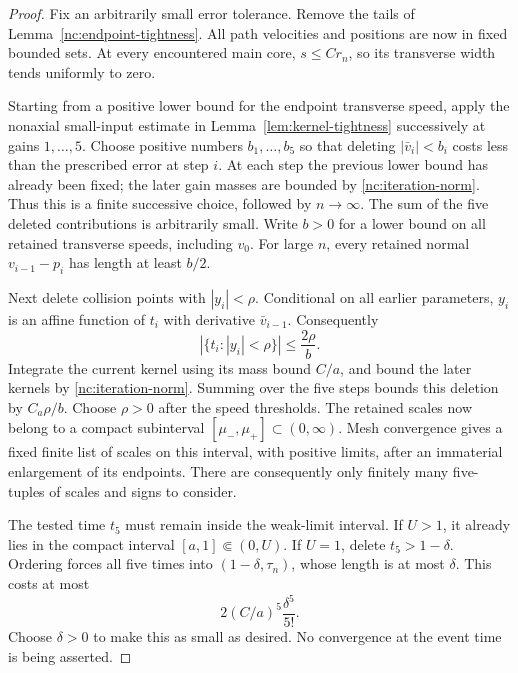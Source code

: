 \begin{proof}
Fix an arbitrarily small error tolerance.  Remove the tails of
Lemma~\ref{nc:endpoint-tightness}.  All path velocities and
positions are now in fixed bounded sets.  At every encountered
main core, \(s\le Cr_n\), so its transverse width tends uniformly
to zero.

Starting from a positive lower bound for the endpoint transverse
speed, apply the nonaxial small-input estimate in
Lemma~\ref{lem:kernel-tightness} successively at gains
\(1,\ldots,5\).  Choose positive numbers \(b_1,\ldots,b_5\)
so that deleting \(|\bar v_i|<b_i\) costs less than the prescribed
error at step \(i\).  At each step the previous lower bound has
already been fixed; the later gain masses are bounded by
\eqref{nc:iteration-norm}.  Thus this is a finite successive
choice, followed by \(n\to\infty\).  The sum of the five deleted
contributions is arbitrarily small.  Write \(b>0\) for a lower
bound on all retained transverse speeds, including \(v_0\).
For large \(n\), every retained normal \(v_{i-1}-p_i\) has length
at least \(b/2\).

Next delete collision points with \(|y_i|<\rho\).
Conditional on all earlier parameters, \(y_i\) is an affine
function of \(t_i\) with derivative \(\bar v_{i-1}\).
Consequently
\[
 \left|\{t_i:|y_i|<\rho\}\right|\le\frac{2\rho}{b}.
\]
Integrate the current kernel using its mass bound \(C/a\),
and bound the later kernels by \eqref{nc:iteration-norm}.
Summing over the five steps bounds this deletion by \(C_a\rho/b\).
Choose \(\rho>0\) after the speed thresholds.  The retained
scales now belong to a compact subinterval
\([\mu_-,\mu_+]\subset(0,\infty)\).
Mesh convergence gives a fixed finite list of scales on this
interval, with positive limits, after an immaterial enlargement
of its endpoints.  There are consequently only finitely many
five-tuples of scales and signs to consider.

The tested time \(t_5\) must remain inside the weak-limit
interval.  If \(U>1\), it already lies in the compact interval
\([a,1]\Subset(0,U)\).  If \(U=1\), delete \(t_5>1-\delta\).
Ordering forces all five times into \((1-\delta,\tau_n)\),
whose length is at most \(\delta\).  This costs at most
\begin{equation}
\label{nc:upper-endpoint-cost}
 2(C/a)^5\frac{\delta^5}{5!}.
\end{equation}
Choose \(\delta>0\) to make this as small as desired.  No
convergence at the event time is being asserted.


\end{proof}
